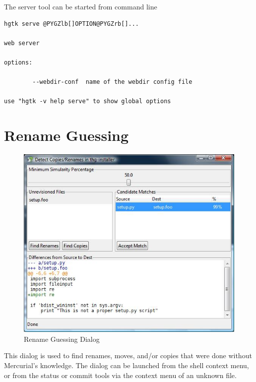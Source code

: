 \documentclass[letterpaper,10pt,english]{manual}
\begin{document}
The server tool can be started from command line

\begin{Verbatim}[commandchars=@\[\]]
hgtk serve @PYGZlb[]OPTION@PYGZrb[]...

web server

options:

        --webdir-conf  name of the webdir config file

use "hgtk -v help serve" to show global options
\end{Verbatim}

\resetcurrentobjects
\hypertarget{--doc-guess}{}

\section{Rename Guessing}
\hypertarget{module-guess.dialog}{}
\begin{figure}[htbp]
\centering

\includegraphics{guess.jpg}
\caption{Rename Guessing Dialog}\end{figure}

This dialog is used to find renames, moves, and/or copies that were done
without Mercurial's knowledge.  The dialog can be launched from the
shell context menu, or from the status or commit tools via the context
menu of an unknown file.
\end{document}
